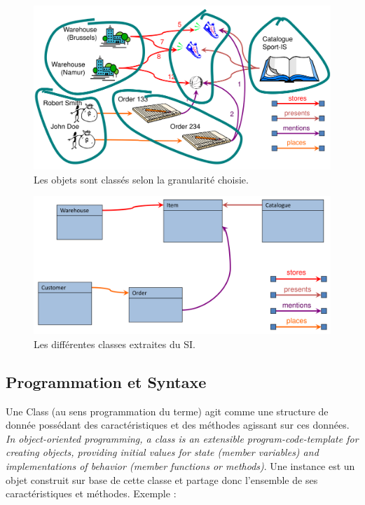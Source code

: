\documentclass[../Syllabus.tex]{subfiles}
\begin{document}
\begin{figure}[htp]
    \centering
    \includegraphics[width=13cm]{./img/chapter2-step3.png}
    \caption{Les objets sont classés selon la granularité choisie.}
    \label{fig:chapter2-step3}
\end{figure}

\begin{figure}[htp]
    \centering
    \includegraphics[width=13cm]{./img/chapter2-step4.png}
    \caption{Les différentes classes extraites du SI.}
    \label{fig:chapter2-step4}
\end{figure}

\clearpage

\subsection{Programmation et Syntaxe}

Une Class (au sens programmation du terme) agit comme une structure de donnée possédant des caractéristiques et des méthodes agissant sur ces données. \textit{In object-oriented programming, a class is an extensible program-code-template for creating objects, providing initial values for state (member variables) and implementations of behavior (member functions or methods)}. Une instance est un objet construit sur base de cette classe et partage donc l'ensemble de ses caractéristiques et méthodes. Exemple :
\end{document}
